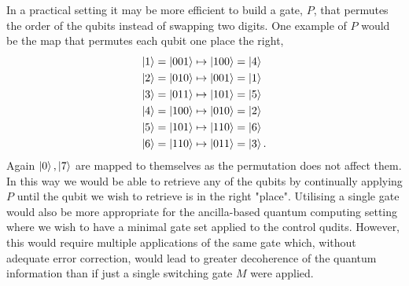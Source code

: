 In a practical setting it may be more efficient to build a gate, $P$, that permutes the order of the qubits instead of swapping two digits.
One example of $P$ would be the map that permutes each qubit one place the right,
\begin{align}
    \ket{1} = \ket{001} &\mapsto \ket{100} = \ket{4}\\
    \ket{2} = \ket{010} &\mapsto \ket{001} = \ket{1}\\
    \ket{3} = \ket{011} &\mapsto \ket{101} = \ket{5}\\
    \ket{4} = \ket{100} &\mapsto \ket{010} = \ket{2}\\
    \ket{5} = \ket{101} &\mapsto \ket{110} = \ket{6}\\
    \ket{6} = \ket{110} &\mapsto \ket{011} = \ket{3}.
\end{align}
Again $\ket{0}, \ket{7}$ are mapped to themselves as the permutation does not affect them.
In this way we would be able to retrieve any of the qubits by continually applying $P$ until the qubit we wish to retrieve is in the right "place".
Utilising a single gate would also be more appropriate for the ancilla-based quantum computing setting where we wish to have a minimal gate set applied to the control qudits.
However, this would require multiple applications of the same gate which, without adequate error correction, would lead to greater decoherence of the quantum information than if just a single switching gate $M$ were applied.